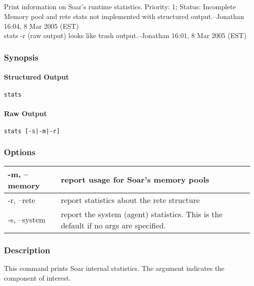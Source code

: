 \subsection{}
\label{stats}
Print information on Soar's runtime statistics. 
 Priority: 1; Status: Incomplete\\ 
Memory pool and rete stats not implemented with structured output.--Jonathan 16:04, 8 Mar 2005 (EST) \\ 
stats -r (raw output) looks like trash output.--Jonathan 16:01, 8 Mar 2005 (EST) 
\subsubsection*{Synopsis}
\paragraph*{Structured Output}
\begin{verbatim}
stats
\end{verbatim}
\paragraph*{Raw Output}
\begin{verbatim}
stats [-s|-m|-r]
\end{verbatim}
\subsubsection*{Options}
\begin{tabular}{|l|l|}
\hline 
 -m, --memory  & report usage for Soar's memory pools  \\
 \hline 
 -r, --rete  & report statistics about the rete structure  \\
 \hline 
 -s, --system  & report the system (agent) statistics. This is the default if no args are specified.  \\
 \hline 
\end{tabular}
\subsubsection*{Description}
This command prints Soar internal statistics. The argument indicates the component of interest.

